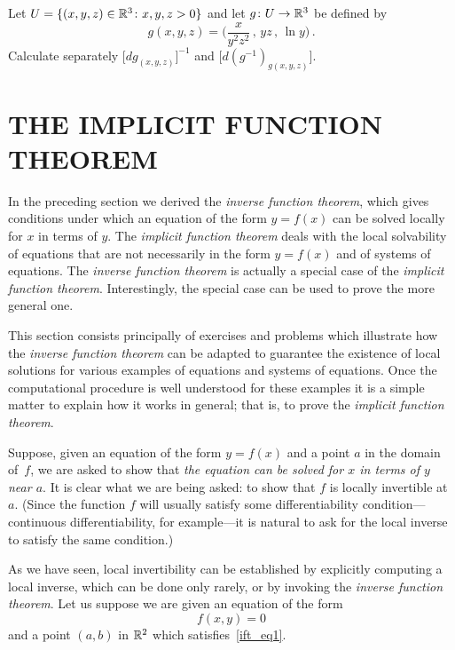 \begin{prob} Let $U = \{(x,y,z) \in \mathbb{R}^3 \colon  x,y,z > 0\}$ and let $g \colon U \rightarrow \mathbb{R}^3$ be
defined by
  \[ g(x,y,z) =\biggl(\frac x{y^2z^2}\,,\,yz\,,\, \ln y\biggr)\,. \]
Calculate separately $\bigl[dg_{(x,y,z)}\bigr]^{-1}$ and $\bigl[d(g^{-1})_{g(x,y,z)}\bigr]$.
\end{prob}












\section{THE IMPLICIT FUNCTION THEOREM}
In the preceding section we derived the \emph{inverse function theorem}, which gives
conditions under which an equation of the form $y = f(x)$ can be solved locally for $x$ in
terms of $y$. The \emph{implicit function theorem} deals with the local solvability of
equations that are not necessarily in the form $y = f(x)$ and of systems of equations. The
\emph{inverse function theorem} is actually a special case of the \emph{implicit function
theorem}. Interestingly, the special case can be used to prove the more general one.

This section consists principally of exercises and problems which illustrate how the
\emph{inverse function theorem} can be adapted to guarantee the existence of local solutions
for various examples of equations and systems of equations. Once the computational procedure
is well understood for these examples it is a simple matter to explain how it works in
general; that is, to prove the \emph{implicit function theorem}.

Suppose, given an equation of the form $y = f(x)$ and a point $a$ in the domain of~$f$, we are
asked to show that \emph{the equation can be solved for $x$ in terms of $y$ near $a$}. It is
clear what we are being asked: to show that $f$ is locally invertible at $a$. (Since the
function $f$ will usually satisfy some differentiability condition---continuous
differentiability, for example---it is natural to ask for the local inverse to satisfy the
same condition.)

As we have seen, local invertibility can be established by explicitly computing a local
inverse, which can be done only rarely, or by invoking the \emph{inverse function theorem}.
Let us suppose we are given an equation of the form
  \begin{equation}\label{ift_eq1}
     f(x,y) = 0
  \end{equation}
and a point $(a,b)$ in $\mathbb{R}^2$ which satisfies~\eqref{ift_eq1}.

